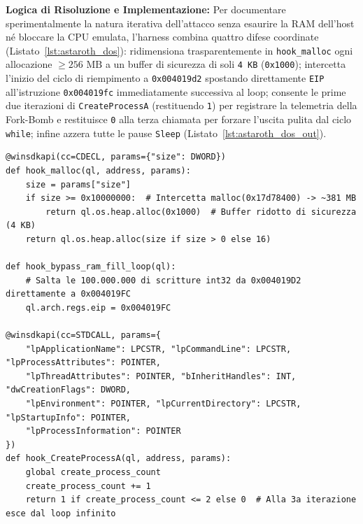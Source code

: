 \documentclass[11pt, a4paper]{article}
\begin{document}
\textbf{Logica di Risoluzione e Implementazione:} Per documentare sperimentalmente la natura iterativa dell'attacco senza esaurire la RAM dell'host n\'e bloccare la CPU emulata, l'harness combina quattro difese coordinate (Listato~\ref{lst:astaroth_dos}): ridimensiona trasparentemente in \texttt{hook\_malloc} ogni allocazione $\ge 256\textrm{ MB}$ a un buffer di sicurezza di soli \texttt{4 KB} (\texttt{0x1000}); intercetta l'inizio del ciclo di riempimento a \texttt{0x004019d2} spostando direttamente \texttt{EIP} all'istruzione \texttt{0x004019fc} immediatamente successiva al loop; consente le prime due iterazioni di \texttt{Create\allowbreak{}ProcessA} (restituendo \texttt{1}) per registrare la telemetria della Fork-Bomb e restituisce \texttt{0} alla terza chiamata per forzare l'uscita pulita dal ciclo \texttt{while}; infine azzera tutte le pause \texttt{Sleep} (Listato~\ref{lst:astaroth_dos_out}).

\begin{lstlisting}[style=pythoncode, caption={Contenimento di malloc(381 MB), salto del loop da 100M di scritture e arresto controllato della Fork-Bomb.}, label={lst:astaroth_dos}]
@winsdkapi(cc=CDECL, params={"size": DWORD})
def hook_malloc(ql, address, params):
    size = params["size"]
    if size >= 0x10000000:  # Intercetta malloc(0x17d78400) -> ~381 MB
        return ql.os.heap.alloc(0x1000)  # Buffer ridotto di sicurezza (4 KB)
    return ql.os.heap.alloc(size if size > 0 else 16)

def hook_bypass_ram_fill_loop(ql):
    # Salta le 100.000.000 di scritture int32 da 0x004019D2 direttamente a 0x004019FC
    ql.arch.regs.eip = 0x004019FC

@winsdkapi(cc=STDCALL, params={
    "lpApplicationName": LPCSTR, "lpCommandLine": LPCSTR, "lpProcessAttributes": POINTER,
    "lpThreadAttributes": POINTER, "bInheritHandles": INT, "dwCreationFlags": DWORD,
    "lpEnvironment": POINTER, "lpCurrentDirectory": LPCSTR, "lpStartupInfo": POINTER,
    "lpProcessInformation": POINTER
})
def hook_CreateProcessA(ql, address, params):
    global create_process_count
    create_process_count += 1
    return 1 if create_process_count <= 2 else 0  # Alla 3a iterazione esce dal loop infinito
\end{lstlisting}
\end{document}
